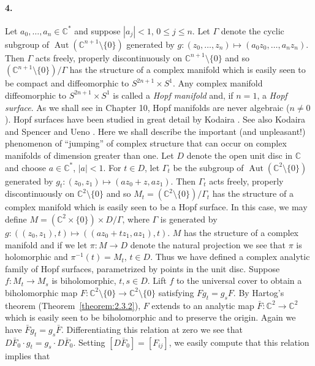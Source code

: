\paragraph*{4.} Let $a_0,\ldots,a_n\in\mathbb C^*$ and suppose $|a_j|<1$, $0\leq j\leq n$. Let $\Gamma$ denote the cyclic subgroup of $\operatorname{Aut}(\mathbb C^{n+1}\setminus\{0\})$ generated by $g:(z_0,\ldots,z_n)\longmapsto(a_0z_0,\ldots,a_nz_n)$. Then $\Gamma$ acts freely, properly discontinuously on $\mathbb C^{n+1}\setminus\{0\}$ and so $(\mathbb C^{n+1}\setminus\{0\})/\Gamma$ has the structure of a complex manifold which is easily seen to be compact and diffeomorphic to $S^{2n+1}\times S^1$. Any complex manifold diffeomorphic to $S^{2n+1}\times S^1$ is called a \emph{Hopf manifold} and, if $n=1$, a \emph{Hopf surface}. As we shall see in Chapter 10, Hopf manifolds are never algebraic ($n\neq0$). Hopf surfaces have been studied in great detail by Kodaira \cite{bib:I:kodaira-k:2}. See also Kodaira and Spencer \cite{bib:I:kodaira-k-and-spencer-d-c:1} and Ueno \cite[pages 235--238]{bib:I:ueno-k:1}. Here we shall describe the important (and unpleasant!) phenomenon of ``jumping'' of complex structure that can occur on complex manifolds of dimension greater than one. Let $D$ denote the open unit disc in $\mathbb C$ and choose $a\in\mathbb C^*$, $|a|<1$. For $t\in D$, let $\Gamma_t$ be the subgroup of $\operatorname{Aut}(\mathbb C^2\setminus\{0\})$ generated by $g_t:(z_0,z_1)\longmapsto(az_0+z,az_1)$. Then $\Gamma_t$ acts freely, properly discontinuously on $\mathbb C^2\setminus\{0\}$ and so $M_t=(\mathbb C^2\setminus\{0\})/\Gamma_t$ has the structure of a complex manifold which is easily seen to be a Hopf surface. In this case, we may define $M=(\mathbb C^2\times\{0\})\times D/\Gamma$, where $\Gamma$ is generated by $g:((z_0,z_1),t)\longmapsto((az_0+tz_1,az_1),t)$. $M$ has the structure of a complex manifold and if we let $\pi:M\longrightarrow D$ denote the natural projection we see that $\pi$ is holomorphic and $\pi^{-1}(t)=M_t$, $t\in D$. Thus we have defined a complex analytic family of Hopf surfaces, parametrized by points in the unit disc. Suppose $f:M_t\longrightarrow M_s$ is biholomorphic, $t,s\in D$. Lift $f$ to the universal cover to obtain a biholomorphic map $F:\mathbb C^2\setminus\{0\}\longrightarrow\mathbb C^2\setminus\{0\}$ satisfying $Fg_t=g_sF$. By Hartog's theorem (Theorem~\ref{theorem:2.3.2}), $F$ extends to an analytic map $\bar F:\mathbb C^2\longrightarrow\mathbb C^2$ which is easily seen to be biholomorphic and to preserve the origin. Again we have $\bar Fg_t=g_s\bar F$. Differentiating this relation at zero we see that $D\bar F_0\cdot g_t=g_s\cdot D\bar F_0$. Setting $[D\bar F_0]=[F_{ij}]$, we easily compute that this relation implies that
